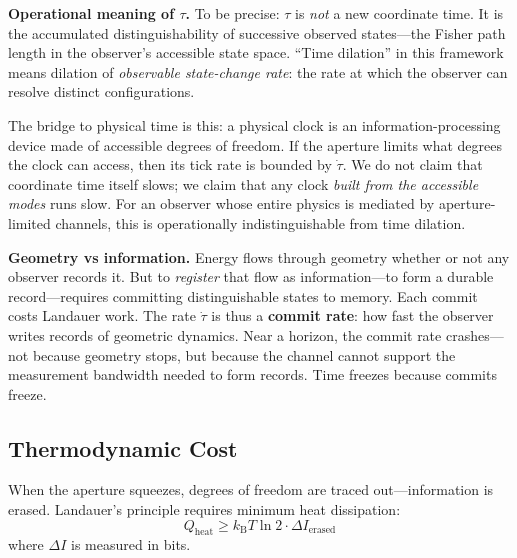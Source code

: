\documentclass[11pt,a4paper]{article}
\begin{document}
\textbf{Operational meaning of $\tau$.} To be precise: $\tau$ is \emph{not} a new coordinate time. It is the accumulated distinguishability of successive observed states---the Fisher path length in the observer's accessible state space. ``Time dilation'' in this framework means dilation of \emph{observable state-change rate}: the rate at which the observer can resolve distinct configurations.

The bridge to physical time is this: a physical clock is an information-processing device made of accessible degrees of freedom. If the aperture limits what degrees the clock can access, then its tick rate is bounded by $\dot{\tau}$. We do not claim that coordinate time itself slows; we claim that any clock \emph{built from the accessible modes} runs slow. For an observer whose entire physics is mediated by aperture-limited channels, this is operationally indistinguishable from time dilation.

\medskip
\noindent{}
\medskip

\textbf{Geometry vs information.} Energy flows through geometry whether or not any observer records it. But to \emph{register} that flow as information---to form a durable record---requires committing distinguishable states to memory. Each commit costs Landauer work. The rate $\dot{\tau}$ is thus a \textbf{commit rate}: how fast the observer writes records of geometric dynamics. Near a horizon, the commit rate crashes---not because geometry stops, but because the channel cannot support the measurement bandwidth needed to form records. Time freezes because commits freeze.

\subsection{Thermodynamic Cost}

When the aperture squeezes, degrees of freedom are traced out---information is erased. Landauer's principle \cite{landauer1961} requires minimum heat dissipation:
\begin{equation}
    Q_{\mathrm{heat}} \geq k_{\mathrm{B}}T \ln 2 \cdot \Delta I_{\mathrm{erased}}
\end{equation}
where $\Delta I$ is measured in bits.
\end{document}
